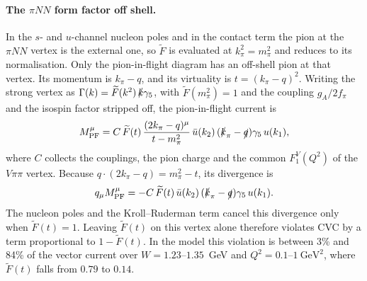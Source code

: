 
\paragraph*{The $\pi NN$ form factor off shell.}
In the $s$- and $u$-channel nucleon poles and in the contact term the pion at the
$\pi NN$ vertex is the external one, so $\widetilde F$ is evaluated at
$k_\pi^2 = m_\pi^2$ and reduces to its normalisation. Only the pion-in-flight
diagram has an off-shell pion at that vertex. Its momentum is $k_\pi - q$, and
its virtuality is $t = (k_\pi - q)^2$. Writing the strong vertex as
$\Gamma(k) = \widetilde F(k^2)\,\slashed{k}\gamma_5$, with
$\widetilde F(m_\pi^2) = 1$ and the coupling $g_A/2f_\pi$ and the isospin factor
stripped off, the pion-in-flight current is
\begin{equation}
  M^\mu_{\rm PF} = C\,\widetilde F(t)\,
  \frac{(2k_\pi - q)^\mu}{t - m_\pi^2}\,
  \bar u(k_2)\,(\slashed{k}_\pi - \slashed{q})\gamma_5\, u(k_1) ,
  \label{eq:MPF}
\end{equation}
where $C$ collects the couplings, the pion charge and the common $F_1^V(Q^2)$
of the $V\pi\pi$ vertex. Because $q\cdot(2k_\pi - q) = m_\pi^2 - t$, its
divergence is
\begin{equation}
  q_\mu M^\mu_{\rm PF} = -C\,\widetilde F(t)\,
  \bar u(k_2)\,(\slashed{k}_\pi - \slashed{q})\gamma_5\, u(k_1) .
\end{equation}
The nucleon poles and the Kroll--Ruderman term cancel this divergence only when
$\widetilde F(t) = 1$. Leaving $\widetilde F(t)$ on this vertex alone therefore
violates CVC by a term proportional to $1 - \widetilde F(t)$. In the model this
violation is between 3\% and 84\% of the vector current over
$W = 1.23$--$1.35$~GeV and $Q^2 = 0.1$--$1~\text{GeV}^2$, where $\widetilde F(t)$
falls from $0.79$ to $0.14$.

